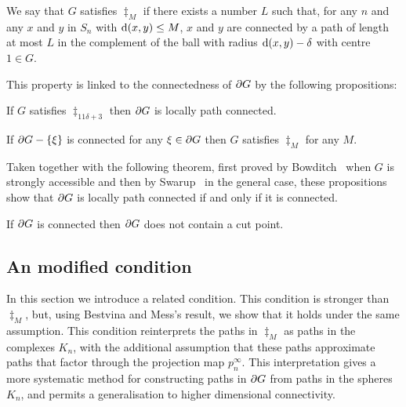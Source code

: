 \documentclass[a4paper]{article}
\begin{document}
\begin{definition}
  We say that $G$ satisfies $\ddag_M$ if there exists a number $L$ such that,
  for any $n$ and any $x$ and $y$ in $S_n$ with $\operatorname{d}(x,y) \leq M$, $x$ and
  $y$ are connected by a path of length at most $L$ in the complement of the
  ball with radius $\operatorname{d}(x,y) - \delta$ with centre $1 \in G$.
\end{definition}

This property is linked to the connectedness of $\partial G$ by the following
propositions:

\begin{proposition}\cite[Proposition 3.2]{bestvinamess91}
  If $G$ satisfies $\ddag_{11\delta + 3}$ then $\partial G$ is locally path
  connected.
\end{proposition}

\begin{proposition}\cite[Proposition ?]{bestvinamess91}\label{prop:BM2}
  If $\partial G - \left\{\xi\right\}$ is connected for any $\xi \in \partial G$ then
  $G$ satisfies $\ddag_M$ for any $M$.
\end{proposition}

Taken together with the following theorem, first proved by
Bowditch~\cite{bowditch98b} when $G$ is strongly accessible and then by
Swarup~\cite{swarup96} in the general case, these propositions show that
$\partial G$ is locally path connected if and only if it is connected.

\begin{theorem}\cite{bowditch98b,swarup96}
  If $\partial G$ is connected then $\partial G$ does not contain a cut
  point.
\end{theorem}

\subsection{An modified condition}

In this section we introduce a related condition. This condition is stronger
than $\ddag_M$, but, using Bestvina and Mess's result, we show that it holds
under the same assumption. This condition reinterprets the paths in $\ddag_M$
as paths in the complexes $K_n$, with the additional assumption that these
paths approximate paths that factor through the projection map $p^\infty_n$.
This interpretation gives a more systematic method for constructing paths in
$\partial G$ from paths in the spheres $K_n$, and permits a generalisation to
higher dimensional connectivity.
\end{document}
